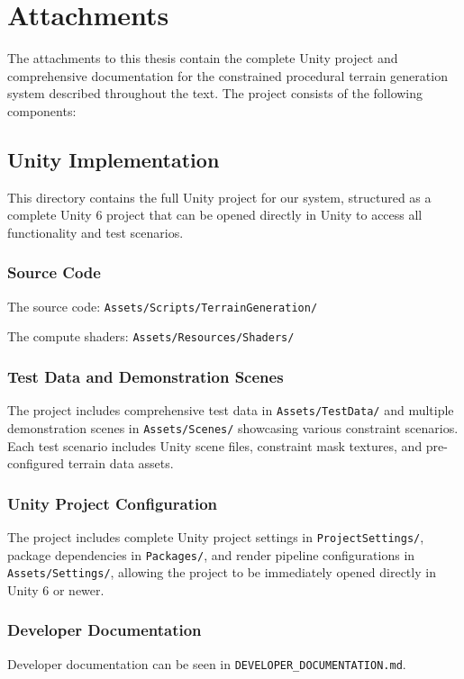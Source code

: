 \documentclass[12pt,a4paper]{report}
\begin{document}
\chapter{Attachments}

The attachments to this thesis contain the complete Unity project and comprehensive documentation for the constrained procedural terrain generation system described throughout the text. The project consists of the following components:

\section{Unity Implementation}

This directory contains the full Unity project for our system, structured as a complete Unity 6 project that can be opened directly in Unity to access all functionality and test scenarios. 

\subsection{Source Code}

The source code: \texttt{Assets/Scripts/TerrainGeneration/} 

The compute shaders: \texttt{Assets/Resources/Shaders/}

\subsection{Test Data and Demonstration Scenes}

The project includes comprehensive test data in \texttt{Assets/TestData/} and multiple demonstration scenes in \texttt{Assets/Scenes/} showcasing various constraint scenarios. Each test scenario includes Unity scene files, constraint mask textures, and pre-configured terrain data assets.

\subsection{Unity Project Configuration}

The project includes complete Unity project settings in \texttt{ProjectSettings/}, package dependencies in \texttt{Packages/}, and render pipeline configurations in \texttt{Assets/Settings/}, allowing the project to be immediately opened directly in Unity 6 or newer.

\subsection{Developer Documentation}
Developer documentation can be seen in \texttt{DEVELOPER\_DOCUMENTATION.md}.
\end{document}
